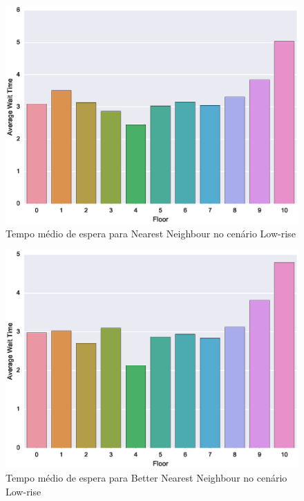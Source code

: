 \begin{figure}[htb!]
  \centering
  \includegraphics[scale=0.8]{img/results/Low-rise/2_Simple_NearestNeighbour/averageWaitTime}
  \caption{Tempo médio de espera para Nearest Neighbour no cenário Low-rise}
  \label{fig:result:low-rise:avgwt:nn}
\end{figure}

\begin{figure}[htb!]
  \centering
  \includegraphics[scale=0.8]{img/results/Low-rise/3_Simple_BetterNearestNeighbour/averageWaitTime}
  \caption{Tempo médio de espera para Better Nearest Neighbour no cenário Low-rise}
  \label{fig:result:low-rise:avgwt:bnn}
\end{figure}

